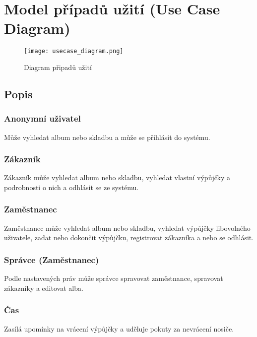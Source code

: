 \section{Model případů užití (Use Case Diagram)}

\begin{figure}[H] 
  \centering
  \texttt{[image: usecase\_diagram.png]}
  \caption{Diagram připadů užití}
\end{figure}


\subsection{Popis}

\subsubsection{Anonymní uživatel}
Může vyhledat album nebo skladbu a může se přihlásit do systému.

\subsubsection{Zákazník}
Zákazník může vyhledat album nebo skladbu, vyhledat vlastní výpůjčky a podrobnosti o nich a odhlásit se ze systému.

\subsubsection{Zaměstnanec}
Zaměstnanec může vyhledat album nebo skladbu, vyhledat výpůjčky libovolného uživatele, zadat nebo dokončit výpůjčku, registrovat zákazníka a nebo se odhlásit.

\subsubsection{Správce (Zaměstnanec)}
Podle nastavených práv může správce spravovat zaměstnance, spravovat zákazníky a editovat alba.

\subsubsection{Čas}
Zasílá upomínky na vrácení výpůjčky a uděluje pokuty za nevrácení nosiče.
